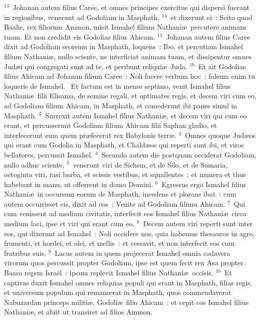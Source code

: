 ${}^{13}$~Johanan autem filius Caree, et omnes principes exercitus qui dispersi fuerant in regionibus, venerunt ad Godoliam in Masphath,
${}^{14}$~et dixerunt ei~: Scito quod Baalis, rex filiorum Ammon, misit Ismahel filium Nathani\ae\ percutere animam tuam. Et non credidit eis Godolias filius Ahicam.
${}^{15}$~Johanan autem filius Caree dixit ad Godoliam seorsum in Masphath, loquens~: Ibo, et percutiam Ismahel filium Nathani\ae , nullo sciente, ne interficiat animam tuam, et dissipentur omnes Jud\ae i qui congregati sunt ad te, et peribunt reliqui\ae\ Juda.
${}^{16}$~Et ait Godolias filius Ahicam ad Johanan filium Caree~: Noli facere verbum hoc~: falsum enim tu loqueris de Ismahel.
~\lettrine[lines=10,image=true,loversize=0.05,lraise=-0.03]{E}{}t factum est in mense septimo, venit Ismahel filius Nathani\ae\ filii Elisama, de semine regali, et optimates regis, et decem viri cum eo, ad Godoliam filium Ahicam, in Masphath, et comederunt ibi panes simul in Masphath.
${}^{2}$~Surrexit autem Ismahel filius Nathani\ae , et decem viri qui cum eo erant, et percusserunt Godoliam filium Ahicam filii Saphan gladio, et interfecerunt eum quem pr\ae fecerat rex Babylonis terr\ae .
${}^{3}$~Omnes quoque Jud\ae os qui erant cum Godolia in Masphath, et Chald\ae os qui reperti sunt ibi, et viros bellatores, percussit Ismahel.
${}^{4}$~Secundo autem die postquam occiderat Godoliam, nullo adhuc sciente,
${}^{5}$~venerunt viri de Sichem, et de Silo, et de Samaria, octoginta viri, rasi barba, et scissis vestibus, et squallentes~: et munera et thus habebant in manu, ut offerrent in domo Domini.
${}^{6}$~Egressus ergo Ismahel filius Nathani\ae\ in occursum eorum de Masphath, incedens et plorans ibat~: cum autem occurrisset eis, dixit ad eos~: Venite ad Godoliam filium Ahicam.
${}^{7}$~Qui cum venissent ad medium civitatis, interfecit eos Ismahel filius Nathani\ae\ circa medium laci, ipse et viri qui erant cum eo.
${}^{8}$~Decem autem viri reperti sunt inter eos, qui dixerunt ad Ismahel~: Noli occidere nos, quia habemus thesauros in agro, frumenti, et hordei, et olei, et mellis~: et cessavit, et non interfecit eos cum fratribus suis.
${}^{9}$~Lacus autem in quem projecerat Ismahel omnia cadavera virorum quos percussit propter Godoliam, ipse est quem fecit rex Asa propter Baasa regem Isra\"el~: ipsum replevit Ismahel filius Nathani\ae\ occisis.
${}^{10}$~Et captivas duxit Ismahel omnes reliquias populi qui erant in Masphath, filias regis, et universum populum qui remanserat in Masphath, quos commendaverat Nabuzardan princeps militi\ae , Godoli\ae\ filio Ahicam~: et cepit eos Ismahel filius Nathani\ae , et abiit ut transiret ad filios Ammon.


